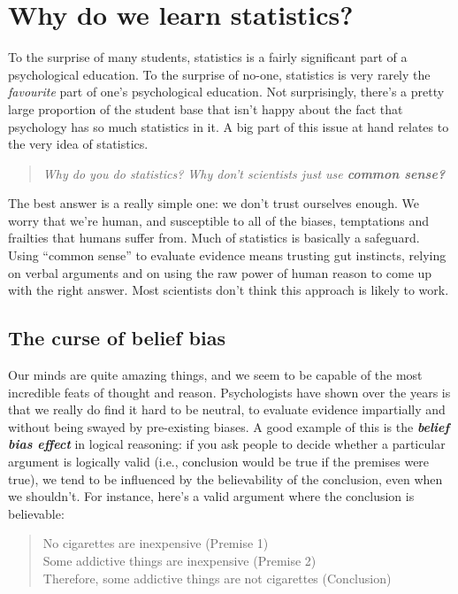 \documentclass[
]{book}
\theoremstyle{definition}
\theoremstyle{definition}
\theoremstyle{definition}
\theoremstyle{definition}
\theoremstyle{remark}
\begin{document}
\hypertarget{whywhywhy}{%
\chapter{Why do we learn statistics?}\label{whywhywhy}}

To the surprise of many students, statistics is a fairly significant part of a psychological education. To the surprise of no-one, statistics is very rarely the \emph{favourite} part of one's psychological education. Not surprisingly, there's a pretty large proportion of the student base that isn't happy about the fact that psychology has so much statistics in it. A big part of this issue at hand relates to the very idea of statistics.

\begin{quote}
\emph{Why do you do statistics? Why don't scientists just use \textbf{common sense?}}
\end{quote}

The best answer is a really simple one: we don't trust ourselves enough. We worry that we're human, and susceptible to all of the biases, temptations and frailties that humans suffer from. Much of statistics is basically a safeguard. Using ``common sense'' to evaluate evidence means trusting gut instincts, relying on verbal arguments and on using the raw power of human reason to come up with the right answer. Most scientists don't think this approach is likely to work.

\hypertarget{the-curse-of-belief-bias}{%
\section{The curse of belief bias}\label{the-curse-of-belief-bias}}

Our minds are quite amazing things, and we seem to be capable of the most incredible feats of thought and reason. Psychologists have shown over the years is that we really do find it hard to be neutral, to evaluate evidence impartially and without being swayed by pre-existing biases. A good example of this is the \textbf{\emph{belief bias effect}} in logical reasoning: if you ask people to decide whether a particular argument is logically valid (i.e., conclusion would be true if the premises were true), we tend to be influenced by the believability of the conclusion, even when we shouldn't. For instance, here's a valid argument where the conclusion is believable:

\begin{quote}
No cigarettes are inexpensive (Premise 1)\\
Some addictive things are inexpensive (Premise 2)\\
Therefore, some addictive things are not cigarettes (Conclusion)
\end{quote}
\end{document}
